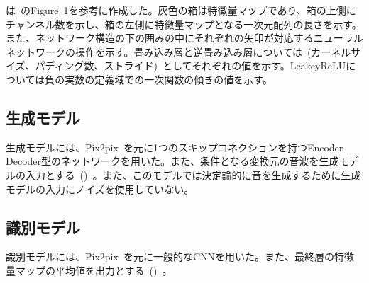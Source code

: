 \clearpage

は~\cite{u-net}のFigure~1を参考に作成した。灰色の箱は特徴量マップであり、箱の上側にチャンネル数を示し、箱の左側に特徴量マップとなる一次元配列の長さを示す。また、ネットワーク構造の下の囲みの中にそれぞれの矢印が対応するニューラルネットワークの操作を示す。畳み込み層と逆畳み込み層については~(カーネルサイズ、パディング数、ストライド)~としてそれぞれの値を示す。LeakeyReLUについては負の実数の定義域での一次関数の傾きの値を示す。

\subsection{生成モデル}

生成モデルには、Pix2pix~\cite{pix2pix}を元に1つのスキップコネクションを持つEncoder-Decoder型のネットワークを用いた。また、条件となる変換元の音波を生成モデルの入力とする~()~。また、このモデルでは決定論的に音を生成するために生成モデルの入力にノイズを使用していない。

\subsection{識別モデル}

識別モデルには、Pix2pix~\cite{pix2pix}を元に一般的なCNNを用いた。また、最終層の特徴量マップの平均値を出力とする~()~。

